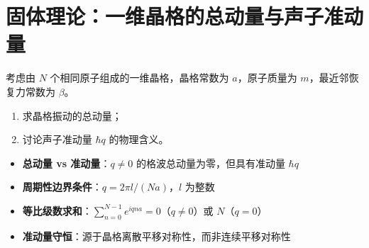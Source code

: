 \section{固体理论：一维晶格的总动量与声子准动量}
\label{sec:phonon-quasimomentum}

\begin{modelbox}[题目：晶格振动的总动量与声子准动量的含义]
考虑由 $N$ 个相同原子组成的一维晶格，晶格常数为 $a$，原子质量为 $m$，最近邻恢复力常数为 $\beta$。
\begin{enumerate}
    \item 求晶格振动的总动量；
    \item 讨论声子准动量 $\hbar q$ 的物理含义。
\end{enumerate}
\end{modelbox}

\begin{tipbox}[考点快速分析]
\begin{itemize}
    \item \textbf{总动量 vs 准动量}：$q\neq0$ 的格波总动量为零，但具有准动量 $\hbar q$
    \item \textbf{周期性边界条件}：$q=2\pi l/(Na)$，$l$ 为整数
    \item \textbf{等比级数求和}：$\sum_{n=0}^{N-1}e^{iqna}=0$（$q\neq0$）或 $N$（$q=0$）
    \item \textbf{准动量守恒}：源于晶格离散平移对称性，而非连续平移对称性
\end{itemize}
\end{tipbox}

